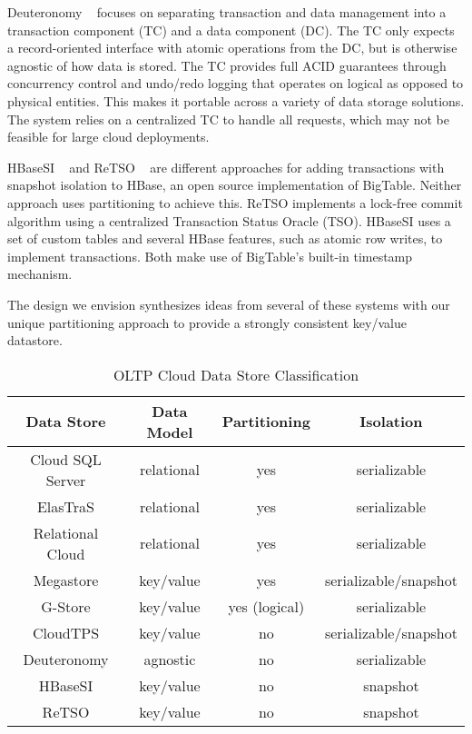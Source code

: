 \documentclass[10pt,final,journal]{IEEEtran}
\begin{document}
Deuteronomy ~\cite{Levandoski:2011:8530161} focuses on separating transaction and data management into a transaction component (TC) and a data component (DC). The TC only expects a record-oriented interface with atomic operations from the DC, but is otherwise agnostic of how data is stored. The TC provides full ACID guarantees through concurrency control and undo/redo logging that operates on logical as opposed to physical entities. This makes it portable across a variety of data storage solutions. The system relies on a centralized TC to handle all requests, which may not be feasible for large cloud deployments.

HBaseSI ~\cite{Zhang:2010:5697970} and ReTSO ~\cite{Junqueira:2011:LTS:2056318.2057148} are different approaches for adding transactions with snapshot isolation to HBase, an open source implementation of BigTable. Neither approach uses partitioning to achieve this. ReTSO implements a lock-free commit algorithm using a centralized Transaction Status Oracle (TSO). HBaseSI uses a set of custom tables and several HBase features, such as atomic row writes, to implement transactions. Both make use of BigTable's built-in timestamp mechanism.

The design we envision synthesizes ideas from several of these systems with our unique partitioning approach to provide a strongly consistent key/value datastore.

\begin{table}[!t]
\renewcommand{\arraystretch}{1.3}
\caption{OLTP Cloud Data Store Classification}
\label{classification}
\centering
\begin{tabular}{|c|c|c|c|}
\hline
\bfseries Data Store  & \bfseries Data Model & \bfseries  Partitioning & \bfseries Isolation \\
\hline
\hline
Cloud SQL Server & relational & yes & serializable \\
ElasTraS & relational & yes & serializable \\
Relational Cloud & relational & yes & serializable \\
Megastore & key/value & yes & serializable/snapshot \\
G-Store & key/value & yes (logical) & serializable \\
CloudTPS & key/value & no & serializable/snapshot \\
Deuteronomy & agnostic & no &serializable \\
HBaseSI & key/value & no & snapshot \\
ReTSO & key/value & no & snapshot \\
\hline
\end{tabular}
\end{table}
\end{document}

